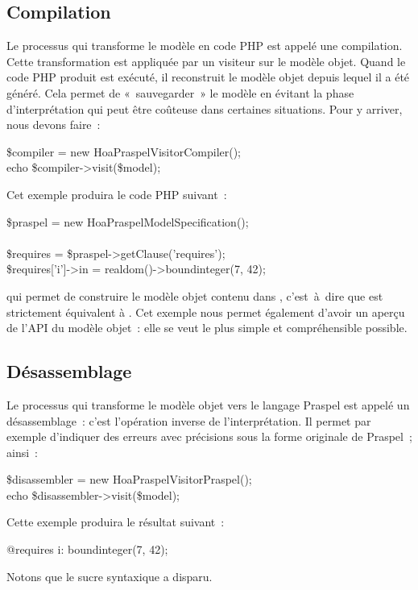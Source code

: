 \subsection{Compilation}
\label{subsection:tools:compilation}

Le processus qui transforme le modèle en code PHP est appelé une compilation.
Cette transformation est appliquée par un visiteur sur le modèle objet. Quand
le code PHP produit est exécuté, il reconstruit le modèle objet depuis lequel il
a été généré. Cela permet de «~sauvegarder~» le modèle en évitant la phase
d'interprétation qui peut être coûteuse dans certaines situations. Pour y
arriver, nous devons faire~:
%
\begin{pre}
\$compiler = new Hoa\bslash{}Praspel\bslash{}Visitor\bslash{}Compiler(); \\
echo \$compiler->visit(\$model);
\end{pre}
%
Cet exemple produira le code PHP suivant~:
%
\begin{pre}
\$praspel = new \bslash{}Hoa\bslash{}Praspel\bslash{}Model\bslash{}Specification(); \\
 \\
\$requires = \$praspel->getClause('requires'); \\
\$requires['i']->in = realdom()->boundinteger(7, 42);
\end{pre}
%
qui permet de construire le modèle objet contenu dans ,
c'est~à~dire que  est strictement équivalent à .
Cet exemple nous permet également d'avoir un aperçu de l'API du modèle objet~:
elle se veut le plus simple et compréhensible possible.

\subsection{Désassemblage}
\label{subsection:tools:disassembler}

Le processus qui transforme le modèle objet vers le langage Praspel est appelé
un désassemblage~: c'est l'opération inverse de l'interprétation. Il permet par
exemple d'indiquer des erreurs avec précisions sous la forme originale de
Praspel~; ainsi~:
%
\begin{pre}
\$disassembler = new Hoa\bslash{}Praspel\bslash{}Visitor\bslash{}Praspel(); \\
echo \$disassembler->visit(\$model);
\end{pre}
Cette exemple produira le résultat suivant~:
%
\begin{pre}
@requires i: boundinteger(7, 42);
\end{pre}
%
Notons que le sucre syntaxique  a disparu.

